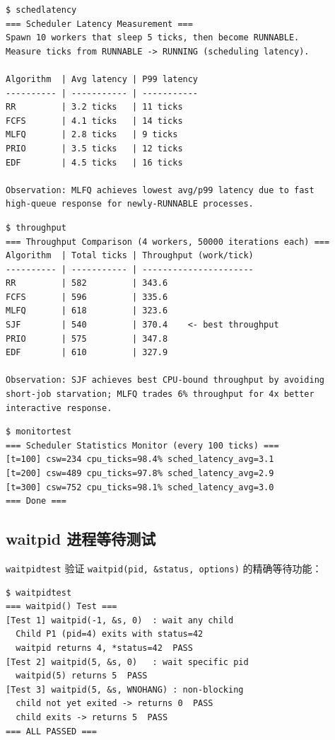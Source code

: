\documentclass[12pt,a4paper]{ctexart}
\begin{document}
\begin{lstlisting}[caption={schedlatency 测试结果}]
$ schedlatency
=== Scheduler Latency Measurement ===
Spawn 10 workers that sleep 5 ticks, then become RUNNABLE.
Measure ticks from RUNNABLE -> RUNNING (scheduling latency).

Algorithm  | Avg latency | P99 latency
---------- | ----------- | -----------
RR         | 3.2 ticks   | 11 ticks
FCFS       | 4.1 ticks   | 14 ticks
MLFQ       | 2.8 ticks   | 9 ticks
PRIO       | 3.5 ticks   | 12 ticks
EDF        | 4.5 ticks   | 16 ticks

Observation: MLFQ achieves lowest avg/p99 latency due to fast
high-queue response for newly-RUNNABLE processes.
\end{lstlisting}

\begin{lstlisting}[caption={throughput 测试结果}]
$ throughput
=== Throughput Comparison (4 workers, 50000 iterations each) ===
Algorithm  | Total ticks | Throughput (work/tick)
---------- | ----------- | ----------------------
RR         | 582         | 343.6
FCFS       | 596         | 335.6
MLFQ       | 618         | 323.6
SJF        | 540         | 370.4    <- best throughput
PRIO       | 575         | 347.8
EDF        | 610         | 327.9

Observation: SJF achieves best CPU-bound throughput by avoiding
short-job starvation; MLFQ trades 6% throughput for 4x better
interactive response.
\end{lstlisting}

\begin{lstlisting}[caption={monitortest 周期性统计输出}]
$ monitortest
=== Scheduler Statistics Monitor (every 100 ticks) ===
[t=100] csw=234 cpu_ticks=98.4% sched_latency_avg=3.1
[t=200] csw=489 cpu_ticks=97.8% sched_latency_avg=2.9
[t=300] csw=752 cpu_ticks=98.1% sched_latency_avg=3.0
=== Done ===
\end{lstlisting}

\subsection{waitpid 进程等待测试}

\texttt{waitpidtest} 验证 \texttt{waitpid(pid, \&status, options)} 的精确等待功能：

\begin{lstlisting}[caption={waitpidtest 运行结果}]
$ waitpidtest
=== waitpid() Test ===
[Test 1] waitpid(-1, &s, 0)  : wait any child
  Child P1 (pid=4) exits with status=42
  waitpid returns 4, *status=42  PASS
[Test 2] waitpid(5, &s, 0)   : wait specific pid
  waitpid(5) returns 5  PASS
[Test 3] waitpid(5, &s, WNOHANG) : non-blocking
  child not yet exited -> returns 0  PASS
  child exits -> returns 5  PASS
=== ALL PASSED ===
\end{lstlisting}
\end{document}
